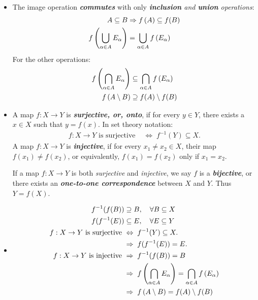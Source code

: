 \documentclass[11pt]{article}
\begin{document}
\begin{itemize}
\item \begin{remark}
The image operation \emph{\textbf{commutes}} with only  \emph{\textbf{inclusion} and \textbf{union} operations}:
\begin{align*}
A \subseteq B & \Rightarrow f\left(A\right) \subseteq f(B) \\
f\left(\bigcup_{\alpha \in A}E_{\alpha}\right) &= \bigcup_{\alpha \in A}f\left(E_{\alpha}\right) 
\end{align*} For the other operations:
\begin{align*}
f\left(\bigcap_{\alpha \in A}E_{\alpha}\right) &\subseteq \bigcap_{\alpha \in A}f\left(E_{\alpha}\right) \\
f\left(A \setminus B\right) &\supseteq f(A) \setminus f(B)
\end{align*}
\end{remark}

\item \begin{definition}
A map $f: X\rightarrow Y$ is \emph{\textbf{surjective, or, onto}}, if for every $y \in Y$, there exists a $x \in X$ such that $y = f(x)$. In set theory notation:
\begin{align*}
f: X\rightarrow Y \text{ is surjective }&\Leftrightarrow \; f^{-1}(Y) \subseteq X.
\end{align*}
A map $f: X\rightarrow Y$ is \emph{\textbf{injective}}, if for every $x_1 \neq x_2 \in X$, their map $f(x_1) \neq f(x_2)$, or equivalently, $f(x_1) = f(x_2)$ only if $x_1 = x_2$.

If a map $f: X\rightarrow Y$ is both \emph{surjective} and \emph{injective}, we say $f$ is a \emph{\textbf{bijective}}, or there exists an \emph{\textbf{one-to-one correspondence}} between $X$ and $Y$. Thus $Y = f(X)$.
\end{definition}

\item \begin{remark}
\begin{align*}
f^{-1}(f(B)) &\supseteq  B,\quad \forall B \subseteq X \\
f(f^{-1}(E)) &\subseteq E,\quad \forall E \subseteq Y \\
f: X\rightarrow Y \text{ is surjective }&\Leftrightarrow \; f^{-1}(Y) \subseteq X. \\
&\Rightarrow  \; f(f^{-1}(E)) = E. \\
f: X\rightarrow Y \text{ is injective }& \Rightarrow\; f^{-1}(f(B)) = B \\
& \Rightarrow\; f\left(\bigcap_{\alpha \in A}E_{\alpha}\right) = \bigcap_{\alpha \in A}f\left(E_{\alpha}\right) \\
& \Rightarrow\; f\left(A \setminus B\right) = f(A) \setminus f(B)
\end{align*}
\end{remark}


\end{itemize}
\end{document}
